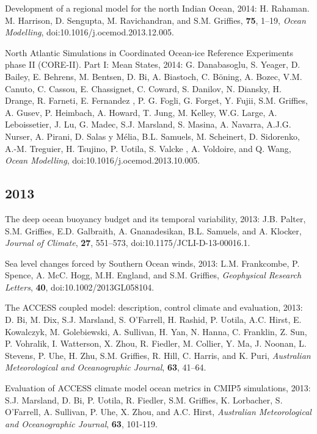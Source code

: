 \begin{etaremune}
\item Development of a regional model for the north Indian Ocean, 2014: H. Rahaman. M. Harrison, D. Sengupta, M.  Ravichandran, and S.M. Grif\/f\/ies, {\bf 75}, 1--19, {\it Ocean Modelling}, doi:10.1016/j.ocemod.2013.12.005.

\item North Atlantic Simulations in Coordinated Ocean-ice Reference Experiments phase II (CORE-II). Part I: Mean States, 2014: G. Danabasoglu, S. Yeager, D. Bailey, E. Behrens, M. Bentsen, D. Bi, A. Biastoch, C. {B\"{o}ning}, A. Bozec, V.M. Canuto, C. Cassou, E. Chassignet, C. Coward, S. Danilov, N. Diansky, H. Drange, R. Farneti, E. Fernandez , P. G. Fogli, G. Forget, Y. Fujii, S.M. Grif\/f\/ies, A.  Gusev, P. Heimbach, A.  Howard, T. Jung,  M. Kelley, W.G. Large, A. Leboissetier, J. Lu, G. Madec, S.J. Marsland, S. Masina, A. Navarra, A.J.G. Nurser, A. Pirani, D. Salas y {M\'{e}lia}, B.L. Samuels, M. Scheinert, D. Sidorenko, A.-M. Treguier, H. Tsujino, P.   Uotila, S. Valcke , A. Voldoire, and Q. Wang, {\it Ocean Modelling}, doi:10.1016/j.ocemod.2013.10.005.

\subsection*{\sc \color{Maroon} 2013}

\item The deep ocean buoyancy budget and its temporal variability,  2013: J.B. Palter, S.M. Grif\/f\/ies, E.D. Galbraith,  A. Gnanadesikan, B.L. Samuels, and A. Klocker, {\it Journal of Climate}, {\bf 27}, 551--573,
  doi:10.1175/JCLI-D-13-00016.1.

\item Sea level changes forced by Southern Ocean winds, 2013: L.M. Frankcombe, P. Spence, A. McC. Hogg, M.H. England, and S.M. Grif\/f\/ies, {\it Geophysical Research Letters}, {\bf 40},  doi:10.1002/2013GL058104.

\item The ACCESS coupled model: description, control climate and  evaluation, 2013: D. Bi, M. Dix, S.J. Marsland, S. O'Farrell, H. Rashid, P. Uotila, A.C. Hirst, E. Kowalczyk, M. Golebiewski,
  A. Sullivan, H. Yan, N. Hanna, C. Franklin, Z. Sun, P. Vohralik, I. Watterson, X. Zhou, R. Fiedler, M. Collier, Y. Ma, J. Noonan,  L. Stevens, P. Uhe, H. Zhu, S.M. Grif\/f\/ies, R. Hill, C. Harris, and K. Puri, {\it Australian Meteorological and
    Oceanographic Journal}, {\bf 63}, 41--64.

\item Evaluation of ACCESS climate model ocean metrics in CMIP5 simulations, 2013: S.J. Marsland, D. Bi, P. Uotila, R. Fiedler, S.M. Grif\/f\/ies, K. Lorbacher, S. O'Farrell, A. Sullivan, P. Uhe, X. Zhou, and A.C. Hirst, {\it Australian Meteorological and
    Oceanographic Journal}, {\bf 63}, 101-119.


\end{etaremune}
